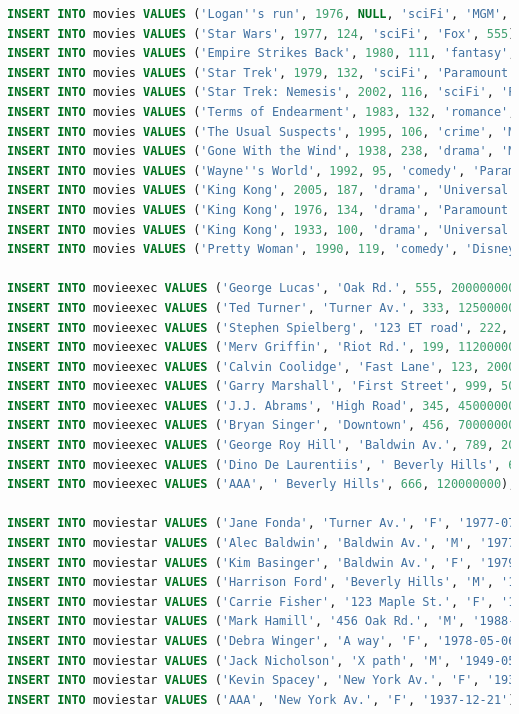 \documentclass{cshwk}
\begin{document}
\begin{lstlisting}[language=sql]
INSERT INTO movies VALUES ('Logan''s run', 1976, NULL, 'sciFi', 'MGM', 123);
INSERT INTO movies VALUES ('Star Wars', 1977, 124, 'sciFi', 'Fox', 555);
INSERT INTO movies VALUES ('Empire Strikes Back', 1980, 111, 'fantasy', 'Fox', 555);
INSERT INTO movies VALUES ('Star Trek', 1979, 132, 'sciFi', 'Paramount', 345);
INSERT INTO movies VALUES ('Star Trek: Nemesis', 2002, 116, 'sciFi', 'Paramount', 345);
INSERT INTO movies VALUES ('Terms of Endearment', 1983, 132, 'romance', 'MGM', 123);
INSERT INTO movies VALUES ('The Usual Suspects', 1995, 106, 'crime', 'MGM', 456);
INSERT INTO movies VALUES ('Gone With the Wind', 1938, 238, 'drama', 'MGM', 123);
INSERT INTO movies VALUES ('Wayne''s World', 1992, 95, 'comedy', 'Paramount', 123);
INSERT INTO movies VALUES ('King Kong', 2005, 187, 'drama', 'Universal', 789);
INSERT INTO movies VALUES ('King Kong', 1976, 134, 'drama', 'Paramount', 666);
INSERT INTO movies VALUES ('King Kong', 1933, 100, 'drama', 'Universal', 345);
INSERT INTO movies VALUES ('Pretty Woman', 1990, 119, 'comedy', 'Disney', 999);

INSERT INTO movieexec VALUES ('George Lucas', 'Oak Rd.', 555, 200000000);
INSERT INTO movieexec VALUES ('Ted Turner', 'Turner Av.', 333, 125000000);
INSERT INTO movieexec VALUES ('Stephen Spielberg', '123 ET road', 222, 100000000);
INSERT INTO movieexec VALUES ('Merv Griffin', 'Riot Rd.', 199, 112000000);
INSERT INTO movieexec VALUES ('Calvin Coolidge', 'Fast Lane', 123, 20000000);
INSERT INTO movieexec VALUES ('Garry Marshall', 'First Street', 999, 50000000);
INSERT INTO movieexec VALUES ('J.J. Abrams', 'High Road', 345, 45000000);
INSERT INTO movieexec VALUES ('Bryan Singer', 'Downtown', 456, 70000000);
INSERT INTO movieexec VALUES ('George Roy Hill', 'Baldwin Av.', 789, 20000000);
INSERT INTO movieexec VALUES ('Dino De Laurentiis', ' Beverly Hills', 666, 120000000);
INSERT INTO movieexec VALUES ('AAA', ' Beverly Hills', 666, 120000000);

INSERT INTO moviestar VALUES ('Jane Fonda', 'Turner Av.', 'F', '1977-07-07');
INSERT INTO moviestar VALUES ('Alec Baldwin', 'Baldwin Av.', 'M', '1977-06-07');
INSERT INTO moviestar VALUES ('Kim Basinger', 'Baldwin Av.', 'F', '1979-05-07');
INSERT INTO moviestar VALUES ('Harrison Ford', 'Beverly Hills', 'M', '1977-07-07');
INSERT INTO moviestar VALUES ('Carrie Fisher', '123 Maple St.', 'F', '1999-09-09');
INSERT INTO moviestar VALUES ('Mark Hamill', '456 Oak Rd.', 'M', '1988-08-08');
INSERT INTO moviestar VALUES ('Debra Winger', 'A way', 'F', '1978-05-06');
INSERT INTO moviestar VALUES ('Jack Nicholson', 'X path', 'M', '1949-05-05');
INSERT INTO moviestar VALUES ('Kevin Spacey', 'New York Av.', 'F', '1937-12-21');
INSERT INTO moviestar VALUES ('AAA', 'New York Av.', 'F', '1937-12-21');


\end{lstlisting}
\end{document}
